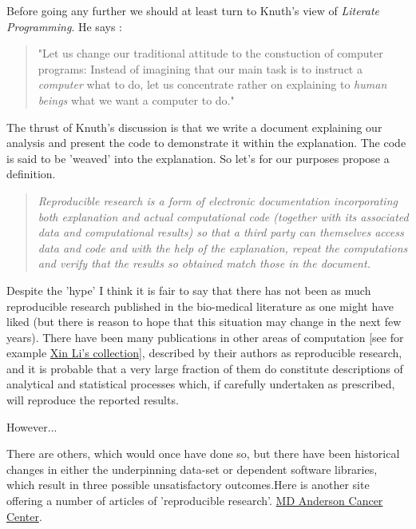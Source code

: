 \documentclass[titlepage]{book}\usepackage{knitr}
\begin{document}
Before going any further we should at least turn to Knuth's view of \emph{Literate Programming}. He says \cite{Knuth1984}:

\begin{quote}
"Let us change our traditional attitude to the constuction of computer programs: Instead of imagining that our main task is to instruct a \emph{computer} what to do, let us concentrate rather on explaining to \emph{human beings} what we want a computer to do."

\end{quote}

The thrust of Knuth's discussion is that we write a document explaining our analysis and present the code to demonstrate it within the explanation.  The code is said to be 'weaved' into the explanation. So let's for our purposes propose a definition.

\begin{quote}
\emph{Reproducible research is a form of electronic documentation incorporating both explanation and actual computational code (together with its associated data and computational results) so that a third party can themselves access data and code and with the help of the explanation, repeat the computations and verify that the results so obtained match those in the document.}
\end{quote}

Despite the 'hype' I think it is fair to say that there has not been as much reproducible research published in the bio-medical literature as one might have liked (but there is reason to hope that this situation may change in the next few years). There have been many publications in other areas of computation [see for example \href{http://www.csee.wvu.edu/\~xinl/source.html}{Xin Li's collection}], described by their authors as reproducible research, and it is probable that a very large fraction of them do constitute descriptions of analytical and statistical processes which, if carefully undertaken as prescribed, will reproduce the reported results.


However...

There are others, which would once have done so, but there have been historical changes in either the underpinning data-set or dependent software libraries, which result in three possible unsatisfactory outcomes.Here is another site offering a number of articles of 'reproducible research'.
\href{http://bioinformatics.mdanderson.org/supplements.html}{MD Anderson Cancer Center}.
\end{document}
